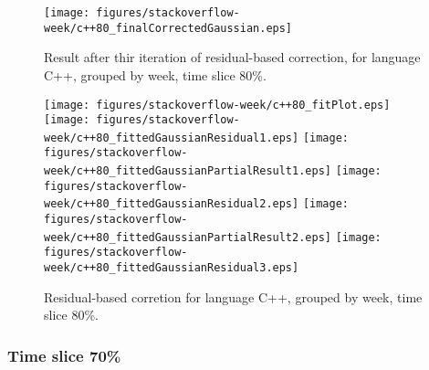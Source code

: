 \begin{figure}[]
\centering
{\texttt{[image: figures/stackoverflow-week/c++80\_finalCorrectedGaussian.eps]}}
\caption{Result after thir iteration of residual-based correction, for language C++, grouped by week, time slice 80\%.}
\end{figure}


\begin{figure}[hb]
\centering
{}
{\texttt{[image: figures/stackoverflow-week/c++80\_fitPlot.eps]}}
{\texttt{[image: figures/stackoverflow-week/c++80\_fittedGaussianResidual1.eps]}}
{\texttt{[image: figures/stackoverflow-week/c++80\_fittedGaussianPartialResult1.eps]}}
{\texttt{[image: figures/stackoverflow-week/c++80\_fittedGaussianResidual2.eps]}}
{\texttt{[image: figures/stackoverflow-week/c++80\_fittedGaussianPartialResult2.eps]}}
{\texttt{[image: figures/stackoverflow-week/c++80\_fittedGaussianResidual3.eps]}}
\caption{Residual-based corretion for language C++, grouped by week, time slice 80\%.}
\end{figure}


\clearpage 
\newpage 


\FloatBarrier

\subsubsection{Time slice 70\%}

